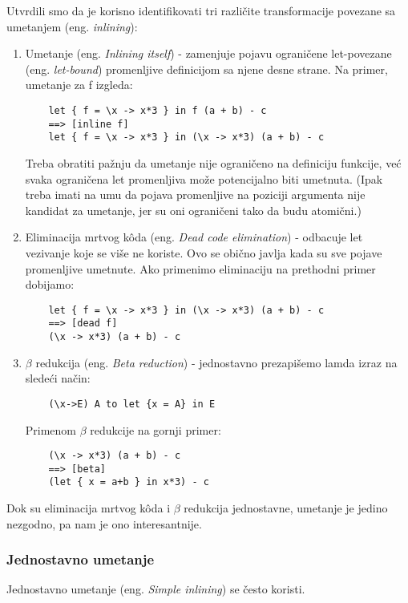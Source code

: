 Utvrdili smo da je korisno identifikovati tri različite transformacije povezane sa umetanjem (eng. \emph{inlining}):
\begin{enumerate}
	\item  Umetanje (eng. \emph{ Inlining itself}) - zamenjuje pojavu ograničene let-povezane (eng. \emph{let-bound}) promenljive definicijom sa njene desne strane. Na primer, umetanje za f izgleda: 
	\begin{verbatim}
	let { f = \x -> x*3 } in f (a + b) - c
	==> [inline f]
	let { f = \x -> x*3 } in (\x -> x*3) (a + b) - c
	\end{verbatim}
	Treba obratiti pažnju da umetanje nije ograničeno na definiciju funkcije, već svaka ograničena let promenljiva može potencijalno biti umetnuta. (Ipak treba imati na umu da pojava promenljive na poziciji argumenta nije kandidat za umetanje, jer su oni ograničeni tako da budu atomični.)
	\item Eliminacija mrtvog k\^{o}da (eng. \emph{Dead code elimination}) - odbacuje let vezivanje koje se više ne koriste. Ovo se obično javlja 
	kada su sve pojave promenljive umetnute. Ako primenimo eliminaciju na prethodni primer dobijamo:
	\begin{verbatim}
	let { f = \x -> x*3 } in (\x -> x*3) (a + b) - c
	==> [dead f]
	(\x -> x*3) (a + b) - c
	\end{verbatim}
	\item $\beta$  redukcija (eng. \emph{Beta reduction}) - jednostavno prezapišemo lamda izraz na sledeći način:
	\begin{verbatim}
	(\x->E) A to let {x = A} in E 
	\end{verbatim} Primenom $\beta$ redukcije na gornji primer:
	\begin{verbatim}
	(\x -> x*3) (a + b) - c
	==> [beta]
	(let { x = a+b } in x*3) - c
	\end{verbatim}
\end{enumerate}

Dok su eliminacija mrtvog k\^{o}da i $\beta$ redukcija jednostavne, umetanje je jedino nezgodno, pa nam je ono interesantnije.

\subsubsection{Jednostavno umetanje}
\label{sec:podpodnaslovSimpleInline}

Jednostavno umetanje (eng. \emph{Simple inlining}) se često koristi. 

